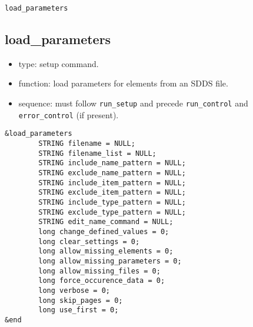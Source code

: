 \documentclass[11pt]{article}
\begin{document}
\newpage
\begin{center}{\Large\verb|load_parameters|}\end{center}
\subsection{load\_parameters \label{subsec:loadparameters}}

\begin{itemize}
\item type: setup command.
\item function: load parameters for elements from an SDDS file.
\item sequence: must follow \verb|run_setup| and precede \verb|run_control| and \verb|error_control| (if present).
\end{itemize}

\begin{verbatim}
&load_parameters
        STRING filename = NULL;
        STRING filename_list = NULL;
        STRING include_name_pattern = NULL;
        STRING exclude_name_pattern = NULL;
        STRING include_item_pattern = NULL;
        STRING exclude_item_pattern = NULL;
        STRING include_type_pattern = NULL;
        STRING exclude_type_pattern = NULL;
        STRING edit_name_command = NULL;
        long change_defined_values = 0;
        long clear_settings = 0;
        long allow_missing_elements = 0;
        long allow_missing_parameters = 0;
        long allow_missing_files = 0;
        long force_occurence_data = 0;
        long verbose = 0;
        long skip_pages = 0;
        long use_first = 0;
&end
\end{verbatim}
\end{document}

